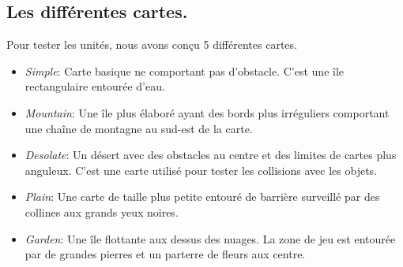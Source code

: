 \documentclass{report}
\begin{document}
\subsection{Les différentes cartes.}
Pour tester les unités, nous avons conçu 5 différentes cartes.
\begin{itemize}
\item \textit{Simple}: Carte basique ne comportant pas d'obstacle. C'est une île rectangulaire entourée d'eau.
\item \textit{Mountain}: Une île plus élaboré ayant des bords plus irréguliers comportant une chaîne de montagne au sud-est de la carte.
\item \textit{Desolate}: Un désert avec des obstacles au centre et des limites de cartes plus anguleux. C'est une carte utilisé pour tester les collisions avec les objets.
\item \textit{Plain}: Une carte de taille plus petite entouré de barrière surveillé par des collines aux grands yeux noires.
\item \textit{Garden}: Une île flottante aux dessus des nuages. La zone de jeu est entourée par de grandes pierres et un parterre de fleurs aux centre.
\end{itemize}
\newpage
\newpage
\end{document}
